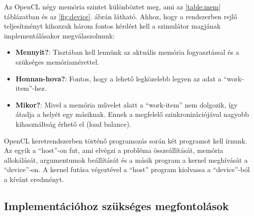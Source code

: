 		Az OpenCL négy memória szintet különböztet meg, ami az
		\ref{table:mem} táblázatban és az \ref{fig:device}. ábrán látható.
		Ahhoz, hogy a rendszerben rejlő teljesítményt kihozzuk három fontos kérdést
		kell a szimulátor magjának implementálásakor megválaszolnunk:
		\begin{itemize}
			\item \textbf{Mennyit?}: Tisztában kell lennünk az aktuális
			memória fogyasztással és a szükséges memóriamérettel.
			\item \textbf{Honnan-hova?}: Fontos, hogy a lehető legközelebb legyen az adat
			a ``work-item''-hez.
			\item \textbf{Mikor?}: Mivel a memória művelet alatt a ``work-item'' nem
			dolgozik, így átadja a helyét egy másiknak. Ennek a megfelelő
			szinkronizációjával nagyobb kihasználtság érhető el (load balance).
		\end{itemize}
		
		\begin{table}[!t]
		\renewcommand{\arraystretch}{1.3}
		\caption{OpenCL memória szintek}
		\label{table:mem}
		\centering
		\end{table}
		

		
		OpenCL keretrendszerben történő programozás során két programot kell írnunk.
		Az egyik a ``host''-on fut, ami elvégzi a probléma összeállítását, memória
		allokálását, argumentumok beállítását és a másik program a kernel meghívását a
		``device''-on.
		A kernel futása végeztével a ``host'' program kiolvassa a ``device''-ból
		a kívánt eredményt.
		
	\subsection{Implementációhoz szükséges megfontolások}
		
